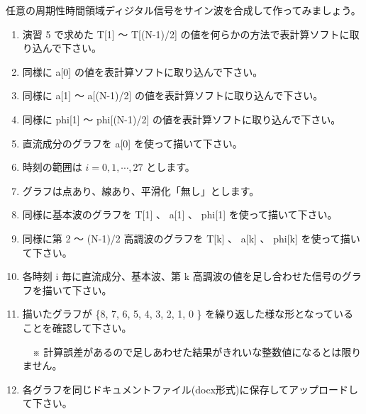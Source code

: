 \documentclass[a4paper]{jarticle}
\begin{document}
 任意の周期性時間領域ディジタル信号をサイン波を合成して作ってみましょう。\par
\vspace{1zh}
\begin{enumerate}
\item 演習 5 で求めた T[1] 〜 T[(N-1)/2] の値を何らかの方法で表計算ソフトに取り込んで下さい。
\item 同様に a[0] の値を表計算ソフトに取り込んで下さい。
\item 同様に a[1] 〜 a[(N-1)/2] の値を表計算ソフトに取り込んで下さい。
\item 同様に phi[1] 〜 phi[(N-1)/2] の値を表計算ソフトに取り込んで下さい。
\item 直流成分のグラフを a[0] を使って描いて下さい。
\item 時刻の範囲は $i = 0, 1,  \cdots, 27$ とします。
\item グラフは点あり、線あり、平滑化「無し」とします。
\item 同様に基本波のグラフを T[1] 、 a[1] 、 phi[1] を使って描いて下さい。
\item 同様に第 2 〜 (N-1)/2 高調波のグラフを T[k] 、 a[k] 、 phi[k] を使って描いて下さい。
\item 各時刻 i 毎に直流成分、基本波、第 k 高調波の値を足し合わせた信号のグラフを描いて下さい。
\item 描いたグラフが \{8, 7, 6, 5, 4, 3, 2, 1, 0 \} を繰り返した様な形となっていることを確認して下さい。\par
　※ 計算誤差があるので足しあわせた結果がきれいな整数値になるとは限りません。
\item 各グラフを同じドキュメントファイル(docx形式)に保存してアップロードして下さい。
\end{enumerate}


\savepractime
\end{document}
